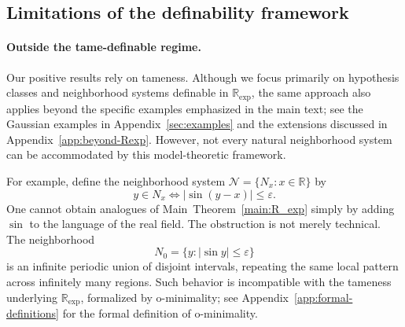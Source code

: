 \documentclass[11pt]{article}
\theoremstyle{plain}
\newtheorem{maintheorem}{Main Theorem}
\theoremstyle{definition}
\theoremstyle{remark}
\DeclareMathOperator{\VCdim}{\mathbb{VC}}
\newcommand{\R}{\mathbb{R}}
\newcommand{\cC}{\mathcal{C}}
\newcommand{\cQ}{\mathcal{Q}}
\newcommand{\cP}{\mathcal{P}}
\newcommand{\rexp}{\operatorname{rexp}}
\begin{document}



\subsection{Limitations of the definability framework}
\label{app:limitations}
\paragraph{Outside the tame-definable regime.}


Our positive results rely on tameness. Although we focus primarily on
hypothesis classes and neighborhood systems definable in \(\R_{\exp}\), the
same approach also applies beyond the specific examples emphasized in the main
text; see the Gaussian examples in Appendix~\ref{sec:examples} and the
extensions discussed in Appendix~\ref{app:beyond-Rexp}. However, not every
natural neighborhood system can be accommodated by this model-theoretic
framework.

For example, define the neighborhood system \(\mathcal N=\{N_x:x\in\R\}\) by
\[
y\in N_x
\Longleftrightarrow
|\sin(y-x)| \le \varepsilon.
\]
One cannot obtain analogues of Main~Theorem~\ref{main:R_exp} simply by adding
\(\sin\) to the language of the real field. The obstruction is not merely
technical. The neighborhood
\[
N_0=\{y:|\sin y|\le\varepsilon\}
\]
is an infinite periodic union of disjoint intervals, repeating the same local
pattern across infinitely many regions. Such behavior is incompatible with the
tameness underlying \(\R_{\exp}\), formalized by o-minimality; see
Appendix~\ref{app:formal-definitions} for the formal definition of o-minimality.
\end{document}
